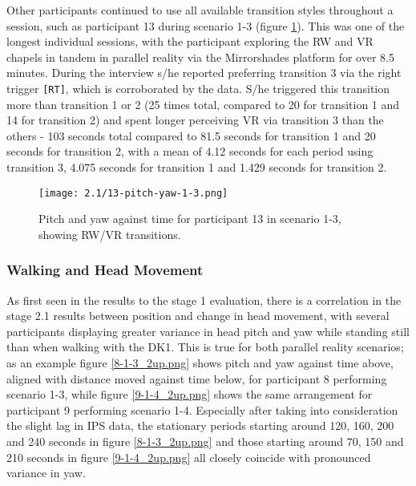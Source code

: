 Other participants continued to use all available transition styles throughout a session, such as participant 13 during scenario 1-3 (figure \ref{13-pitch-yaw-1-3.png}). This was one of the longest individual sessions, with the participant exploring the RW and VR chapels in tandem in parallel reality via the Mirrorshades platform for over 8.5 minutes. During the interview s/he reported preferring transition 3 via the right trigger \texttt{[RT]}, which is corroborated by the data. S/he triggered this transition more than transition 1 or 2 (25 times total, compared to 20 for transition 1 and 14 for transition 2) and spent longer perceiving VR via transition 3 than the others - 103 seconds total compared to 81.5 seconds for transition 1 and 20 seconds for transition 2, with a mean of 4.12 seconds for each period using transition 3, 4.075 seconds for transition 1 and 1.429 seconds for transition 2.

\begin{figure}[h]
	\begin{center}
	\texttt{[image: 2.1/13-pitch-yaw-1-3.png]}
	\caption{Pitch and yaw against time for participant 13 in scenario 1-3, showing RW/VR transitions.}
	\label{13-pitch-yaw-1-3.png}
	\end{center}
\end{figure}


\subsubsection{Walking and Head Movement}

As first seen in the results to the stage 1 evaluation, there is a correlation in the stage 2.1 results between position and change in head movement, with several participants displaying greater variance in head pitch and yaw while standing still than when walking with the DK1. This is true for both parallel reality scenarios; as an example figure \ref{8-1-3_2up.png} shows pitch and yaw against time above, aligned with distance moved against time below, for participant 8 performing scenario 1-3, while figure \ref{9-1-4_2up.png} shows the same arrangement for participant 9 performing scenario 1-4. Especially after taking into consideration the slight lag in IPS data, the stationary periods starting around 120, 160, 200 and 240 seconds in figure \ref{8-1-3_2up.png} and those starting around 70, 150 and 210 seconds in figure \ref{9-1-4_2up.png} all closely coincide with pronounced variance in yaw.

